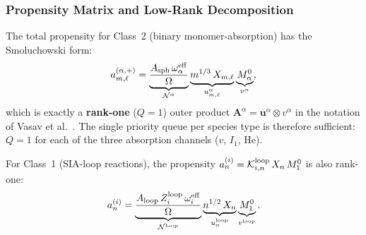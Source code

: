 \subsubsection{Propensity Matrix and Low-Rank Decomposition}
\label{sec:hybrid_lowrank}

The total propensity for Class~2 (binary monomer-absorption) has
the Smoluchowski form:
\begin{equation}\label{eq:propmatrix}
    a_{m,\ell}^{(\alpha,+)}
    = \underbrace{
      \frac{A_{\rm sph}\,\omega_\alpha^{\rm eff}}{\Omega}
      }_{\mathcal{N}^\alpha}
      \underbrace{
        m^{1/3}\,X_{m,\ell}
        }_{u_{m,\ell}^\alpha}
      \underbrace{
        M_\alpha^0
        }_{v^\alpha},
\end{equation}
which is exactly a \textbf{rank-one} ($Q=1$) outer product
$\mathbf{A}^\alpha = \mathbf{u}^\alpha \otimes v^\alpha$
in the notation of Vasav et al.~\cite{Vasav2026}.  The single
priority queue per species type is therefore sufficient:
$Q = 1$ for each of the three absorption channels ($v$, $I_1$,
He).

For Class~1 (SIA-loop reactions), the propensity
$a_n^{(i)} = \mathcal{K}_{i,n}^{\rm loop}\,X_n\,M_1^0$ is also
rank-one:
\begin{equation}\label{eq:propmatrix_loop}
    a_n^{(i)}
    = \underbrace{
      \frac{A_{\rm loop}\,Z_i^{\rm loop}\,\omega_i^{\rm eff}}{\Omega}
      }_{\mathcal{N}^{\rm loop}}
      \underbrace{n^{1/2}\,X_n}_{u_n^{\rm loop}}
      \underbrace{M_1^0}_{v^{\rm loop}}.
\end{equation}

